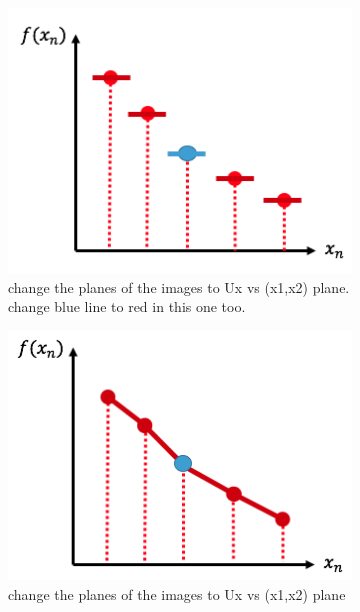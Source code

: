 \documentclass[12pt]{article}
\begin{document}
\begin{itemize}
\begin{figure}[h]
	\centering
	\begin{subfigure}[b]{0.45\textwidth}
		\includegraphics[width=\textwidth]{flat_recon}
		\caption{change the planes of the images to Ux vs (x1,x2) plane. change blue line to red in this one too.}
	\end{subfigure}
	\begin{subfigure}[b]{0.45\textwidth}
	\includegraphics[width=\textwidth]{linear_recon}
	\caption{change the planes of the images to Ux vs (x1,x2) plane}
	\end{subfigure}
	\begin{subfigure}[b]{0.45\textwidth}

\end{subfigure}
\end{figure}
\end{itemize}
\end{document}
